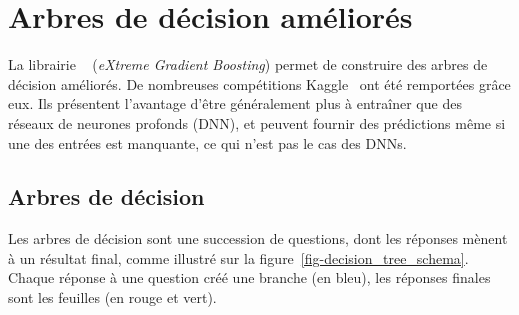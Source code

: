 \section{Arbres de décision améliorés}\label{chapter-ML-section-XGB}
La librairie
\XGBOOST~\cite{xgboost}
(\emph{eXtreme Gradient Boosting})
permet de construire des
arbres de décision améliorés.
De nombreuses compétitions Kaggle~\cite{kaggle_challenge} ont été remportées grâce eux.
Ils présentent l'avantage d'être généralement plus à entraîner que des réseaux de neurones profonds (DNN),
et peuvent fournir des prédictions même si une des entrées est manquante, ce qui n'est pas le cas des DNNs.
\subsection{Arbres de décision}
Les arbres de décision sont une succession de questions,
dont les réponses mènent à un résultat final,
comme illustré sur la figure~\ref{fig-decision_tree_schema}.
Chaque réponse à une question créé une \og branche \fg{} (en bleu),
les réponses finales sont les \og feuilles \fg{} (en rouge et vert).
